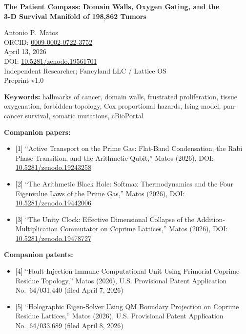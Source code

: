 \documentclass[
  11pt,
]{article}
\author{}
\date{}
\providecommand{\tightlist}{%
  \setlength{\itemsep}{0pt}\setlength{\parskip}{0pt}}
\begin{document}
\begin{center}
{\LARGE\bfseries The Patient Compass: Domain Walls, Oxygen Gating, and the\\
3-D Survival Manifold of 198,862 Tumors}

\vspace{1.5em}

{\large Antonio P.\ Matos}\\[0.4em]
{\small ORCID: \href{https://orcid.org/0009-0002-0722-3752}{0009-0002-0722-3752}}\\[0.3em]
April 13, 2026\\[0.3em]
{\small DOI: \href{https://doi.org/10.5281/zenodo.19561701}{10.5281/zenodo.19561701}}\\[0.3em]
Independent Researcher; Fancyland LLC / Lattice OS\\[0.3em]
Preprint v1.0

\vspace{0.8em}

{\small\textbf{Keywords:} hallmarks of cancer, domain walls, frustrated proliferation, tissue oxygenation, forbidden topology, Cox proportional hazards, Ising model, pan-cancer survival, somatic mutations, cBioPortal}
\end{center}

\textbf{Companion papers:}

\begin{itemize}
\tightlist
\item
  {[}1{]} ``Active Transport on the Prime Gas: Flat-Band Condensation,
  the Rabi Phase Transition, and the Arithmetic Qubit,'' Matos (2026),
  DOI:
  \href{https://doi.org/10.5281/zenodo.19243258}{10.5281/zenodo.19243258}
\item
  {[}2{]} ``The Arithmetic Black Hole: Softmax Thermodynamics and the
  Four Eigenvalue Laws of the Prime Gas,'' Matos (2026), DOI:
  \href{https://doi.org/10.5281/zenodo.19442006}{10.5281/zenodo.19442006}
\item
  {[}3{]} ``The Unity Clock: Effective Dimensional Collapse of the
  Addition-Multiplication Commutator on Coprime Lattices,'' Matos
  (2026), DOI:
  \href{https://doi.org/10.5281/zenodo.19478727}{10.5281/zenodo.19478727}
\end{itemize}

\textbf{Companion patents:}

\begin{itemize}
\tightlist
\item
  {[}4{]} ``Fault-Injection-Immune Computational Unit Using Primorial
  Coprime Residue Topology,'' Matos (2026), U.S. Provisional Patent
  Application No.~64/031,440 (filed April 7, 2026)
\item
  {[}5{]} ``Holographic Eigen-Solver Using QM Boundary Projection on
  Coprime Residue Lattices,'' Matos (2026), U.S. Provisional Patent
  Application No.~64/033,689 (filed April 8, 2026)
\end{itemize}
\end{document}
